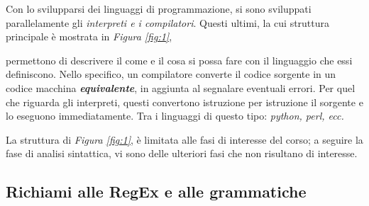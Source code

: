 \documentclass{subfiles}
\begin{document}
Con lo svilupparsi dei linguaggi di programmazione, si sono sviluppati parallelamente gli \emph{interpreti \emph{e i} compilatori}.
Questi ultimi, la cui struttura principale è mostrata in \emph{Figura \ref{fig:1}},

permettono di descrivere il come e il cosa si possa fare con il linguaggio che essi definiscono.
Nello specifico, un compilatore converte il codice sorgente in un codice macchina \emph\textbf{equivalente},
in aggiunta al segnalare eventuali errori.
Per quel che riguarda gli interpreti, questi convertono istruzione per istruzione il sorgente e lo eseguono immediatamente.
Tra i linguaggi di questo tipo: \emph{python, perl, ecc.}

\begin{Remark*}
    La struttura di \emph{Figura \ref{fig:1}}, è limitata alle fasi di interesse del corso; a seguire la fase di analisi sintattica,
    vi sono delle ulteriori fasi che non risultano di interesse.
\end{Remark*}

\subsection{Richiami alle RegEx e alle grammatiche}

\clearpage
\end{document}
